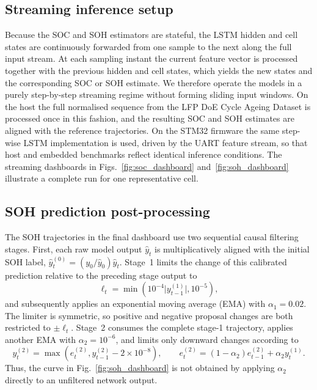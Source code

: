 \documentclass[review]{elsarticle}
\begin{document}
\subsection{Streaming inference setup}
Because the SOC and SOH estimators are stateful, the LSTM hidden and cell states are continuously forwarded from one sample to the next along the full input stream. At each sampling instant the current feature vector is processed together with the previous hidden and cell states, which yields the new states and the corresponding SOC or SOH estimate. We therefore operate the models in a purely step-by-step streaming regime without forming sliding input windows. On the host the full normalised sequence from the LFP DoE Cycle Ageing Dataset is processed once in this fashion, and the resulting SOC and SOH estimates are aligned with the reference trajectories. On the STM32 firmware the same step-wise LSTM implementation is used, driven by the UART feature stream, so that host and embedded benchmarks reflect identical inference conditions. The streaming dashboards in Figs.~\ref{fig:soc_dashboard} and~\ref{fig:soh_dashboard} illustrate a complete run for one representative cell.
\subsection{SOH prediction post-processing}\label{sec:soh_filter_method}
The SOH trajectories in the final dashboard use two sequential causal filtering stages. First, each raw model output $\hat y_t$ is multiplicatively aligned with the initial SOH label, $\hat y_t^{(0)}=(y_0/\hat y_0)\hat y_t$. Stage~1 limits the change of this calibrated prediction relative to the preceding stage output to
\begin{equation}
    \ell_t = \min\!\left(10^{-4}\lvert y_{t-1}^{(1)}\rvert,10^{-5}\right),
\end{equation}
and subsequently applies an exponential moving average (EMA) with $\alpha_1=0.02$. The limiter is symmetric, so positive and negative proposal changes are both restricted to $\pm\ell_t$. Stage~2 consumes the complete stage-1 trajectory, applies another EMA with $\alpha_2=10^{-6}$, and limits only downward changes according to
\begin{equation}
    y_t^{(2)}=\max\!\left(e_t^{(2)},y_{t-1}^{(2)}-2\times10^{-8}\right),\qquad
    e_t^{(2)}=(1-\alpha_2)e_{t-1}^{(2)}+\alpha_2 y_t^{(1)}.
\end{equation}
Thus, the curve in Fig.~\ref{fig:soh_dashboard} is not obtained by applying $\alpha_2$ directly to an unfiltered network output.
\end{document}
